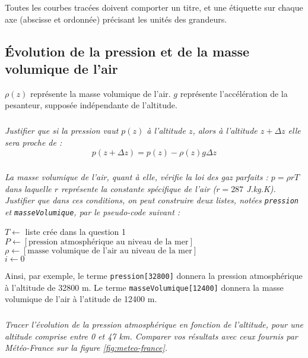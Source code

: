 \documentclass[10pt]{article}
\begin{document}
\begin{rem}
Toutes les courbes tracées doivent comporter un titre, et une étiquette sur chaque axe (abscisse et ordonnée) précisant les unités des grandeurs.
\end{rem}

\subsection{\'Evolution de la pression et de la masse volumique de l'air}
$\rho(z)$ représente la masse volumique de l'air. $g$ représente l'accélération de la pesanteur, supposée indépendante de l'altitude.

\subparagraph{}
\textit{Justifier que si la pression vaut $p(z)$ à l'altitude $z$, alors à l'altitude $z+\Delta z$ elle sera proche de :
\[p(z+\Delta z)=p(z)-\rho(z) g \Delta z\] }

\subparagraph{}\textit{
La masse volumique de l'air, quant à elle, vérifie la loi des gaz parfaits : $p=\rho r T$ dans laquelle $r$ représente la constante spécifique de l'air ($r=287$ J.kg.K). Justifier que dans ces conditions, on peut construire deux listes, notées
\texttt{pression} et \texttt{masseVolumique}, par le pseudo-code suivant :}

\begin{pseudo}
\begin{algorithm}[H]
$T\gets$ liste crée dans la question 1\\
$P \gets [\text{pression atmosphérique au niveau de la mer}]$\\
$\rho \gets [\text{masse volumique de l'air au niveau de la mer}]$\\
$i\gets 0$\\
\end{algorithm}
\end{pseudo}

Ainsi, par exemple, le terme \texttt{pression[32800]} donnera la pression atmosphérique à l'altitude de 32800 m. Le terme \texttt{masseVolumique[12400]} donnera la masse volumique de l'air à l'atitude de 12400 m.


\subparagraph{}
\textit{Tracer l'évolution de la pression atmosphérique en fonction de l'altitude, pour une altitude comprise entre 0 et 47 km. Comparer vos résultats avec ceux fournis par Météo-France sur la figure \ref{fig:meteo-france}.}
\end{document}
